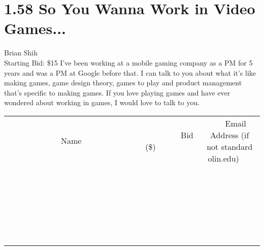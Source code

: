 \documentclass[11pt]{article}
\begin{document}
\section*{1.58 So You Wanna Work in Video Games...}
Brian Shih
\\
Starting Bid: \$15
\newline
I’ve been working at a mobile gaming company as a PM for 5 years and was a PM at Google before that. I can talk to you about what it’s like making games, game design theory, games to play and product management that’s specific to making games. If you love playing games and have ever wondered about working in games, I would love to talk to you.
\\[6ex]
\begin{tabular}{c c c}
~~~~~~~~~~~~~Name~~~~~~~~~~~~~ & ~~~~~~~~~Bid (\$)~~~~~~~~~  & ~~~Email Address (if not standard olin.edu)~~~\\
 & & \\
\hline
 & & \\
\hline
 & & \\
\hline
 & & \\
\hline
 & & \\
\hline
 & & \\
\hline
 & & \\
\hline
 & & \\
\hline
 & & \\
\hline
 & & \\
\hline
 & & \\
\hline
 & & \\
\hline
 & & \\
\hline
 & & \\
\hline
 & & \\
\hline
 & & \\
\hline
 & & \\
\hline
 & & \\
\hline
 & & \\
\hline
 & & \\
\hline
 & & \\
\hline
 & & \\
\hline
 & & \\
\hline
 & & \\
\hline
 & & \\
\hline
 & & \\
\hline
\end{tabular}
\newpage
\end{document}
